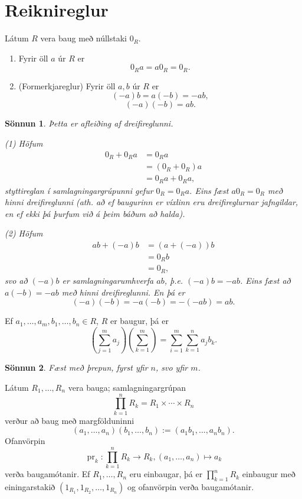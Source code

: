 \documentclass[a4paper,icelandic,11pt]{book}
\theoremstyle{plain}
\newtheorem*{sonnun}{Sönnun}
\DeclareMathOperator{\pr}{pr} %
\begin{document}
\section{Reiknireglur}
\begin{setn}
  Látum $R$ vera baug með núllstaki $0_R$.
  \begin{enumerate}[(1)]
    \item Fyrir öll $a$ úr $R$ er
    \[
      0_Ra = a0_R = 0_R.
    \]
    \item (Formerkjareglur) Fyrir öll $a,b$ úr $R$ er
    \[
      (-a)b = a(-b) = -ab,
    \]\[
      (-a)(-b) = ab.
    \]
  \end{enumerate}
\end{setn}
\begin{sonnun}
  Þetta er afleiðing af dreifireglunni.
  
  (1) Höfum
  \begin{align*}
    0_R + 0_R a 
    &= 0_R a
    \\
    &= (0_R + 0_R)a
    \\
    &= 0_R a + 0_R a, \tag{dreifiregla}
  \end{align*}
  styttireglan í samlagningargrúpunni gefur $0_R=0_R a$. Eins fæst
  $a0_R = 0_R$ með hinni dreifireglunni (ath. að ef baugurinn er víxlinn
  eru dreifireglurnar jafngildar, en ef ekki þá þurfum við á þeim báðum að
  halda).
  
  (2) Höfum
  \begin{align*}
    ab + (-a)b 
    &= (a+(-a))b \tag{dreifiregla}
    \\
    &= 0_R b
    \\
    &= 0_R,
  \end{align*}
  svo að $(-a)b$ er samlagningarumhverfa $ab$, þ.e. $(-a)b = -ab$. Eins fæst
  að $a(-b) = -ab$ með hinni dreifireglunni. En þá er
  \[
    (-a)(-b) = -a(-b) = -(-ab) = ab.
  \]
\end{sonnun}
\begin{setn}
  Ef $a_1,\dots,a_m,b_1,\dots,b_n\in R$, $R$ er baugur, þá er 
  \[
    \left( \sum_{j=1}^m a_j \right) \left( \sum_{k=1}^{m} \right)
    =
    \sum_{i=1}^{m} \sum_{k=1}^{n} a_j b_k.
  \]
\end{setn}
\begin{sonnun}
  Fæst með þrepun, fyrst yfir $n$, svo yfir $m$.
\end{sonnun}
\begin{setn}
  Látum $R_1,\dots,R_n$ vera bauga; samlagningargrúpan
  \[
    \prod_{k=1}^{n} R_k = R_1\times \cdots \times R_n
  \]
  verður að baug með margfölduninni
  \[
    (a_1,\dots,a_n)(b_1,\dots,b_n)
    := (a_1 b_1,\dots,a_n b_n).
  \]
  Ofanvörpin
  \[
    \pr_k : \prod_{k=1}^{n} R_k \to R_k, 
    (a_1,\dots,a_n) \mapsto a_k
  \]
  verða baugamótanir. Ef $R_1,\dots,R_n$ eru einbaugar, þá er
  $\prod_{k=1}^{n}R_k$ einbaugur með einingarstakið
  $(1_{R_1},1_{R_2},\dots,1_{R_n})$ og ofanvörpin verða baugamótanir.
\end{setn}
\end{document}
